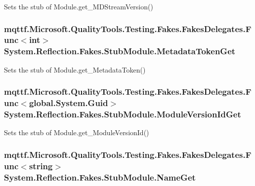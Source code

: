 Sets the stub of Module.\-get\-\_\-\-M\-D\-Stream\-Version()

\hypertarget{class_system_1_1_reflection_1_1_fakes_1_1_stub_module_ac7709e6ea6772ec4ecf044e8ecd47213}{
\subsubsection[{Metadata\-Token\-Get}]{\setlength{\rightskip}{0pt plus 5cm}mqttf.\-Microsoft.\-Quality\-Tools.\-Testing.\-Fakes.\-Fakes\-Delegates.\-Func$<$int$>$ System.\-Reflection.\-Fakes.\-Stub\-Module.\-Metadata\-Token\-Get}}\label{class_system_1_1_reflection_1_1_fakes_1_1_stub_module_ac7709e6ea6772ec4ecf044e8ecd47213}


Sets the stub of Module.\-get\-\_\-\-Metadata\-Token()

\hypertarget{class_system_1_1_reflection_1_1_fakes_1_1_stub_module_ab362a0ffc71693bd38cd51f8ecd8545d}{
\subsubsection[{Module\-Version\-Id\-Get}]{\setlength{\rightskip}{0pt plus 5cm}mqttf.\-Microsoft.\-Quality\-Tools.\-Testing.\-Fakes.\-Fakes\-Delegates.\-Func$<$global.\-System.\-Guid$>$ System.\-Reflection.\-Fakes.\-Stub\-Module.\-Module\-Version\-Id\-Get}}\label{class_system_1_1_reflection_1_1_fakes_1_1_stub_module_ab362a0ffc71693bd38cd51f8ecd8545d}


Sets the stub of Module.\-get\-\_\-\-Module\-Version\-Id()

\hypertarget{class_system_1_1_reflection_1_1_fakes_1_1_stub_module_a8a18d696e2697c176d984fcd8c7e3a46}{
\subsubsection[{Name\-Get}]{\setlength{\rightskip}{0pt plus 5cm}mqttf.\-Microsoft.\-Quality\-Tools.\-Testing.\-Fakes.\-Fakes\-Delegates.\-Func$<$string$>$ System.\-Reflection.\-Fakes.\-Stub\-Module.\-Name\-Get}}\label{class_system_1_1_reflection_1_1_fakes_1_1_stub_module_a8a18d696e2697c176d984fcd8c7e3a46}


